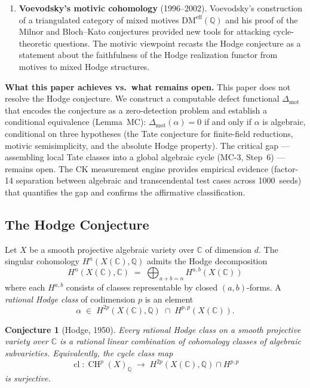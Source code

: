 \documentclass[11pt]{article}
\newtheorem{conjecture}[theorem]{Conjecture}
\theoremstyle{definition}
\DeclareMathOperator{\cl}{cl}
\DeclareMathOperator{\CH}{CH}
\begin{document}
\begin{enumerate}[label=(\roman*)]
  \item \textbf{Voevodsky's motivic cohomology} (1996--2002).
    Voevodsky's construction of a triangulated category of mixed motives
    $\mathrm{DM}^{\mathrm{eff}}(\mathbb{Q})$ and his proof of the Milnor
    and Bloch--Kato conjectures provided new tools for attacking cycle-theoretic
    questions.  The motivic viewpoint recasts the Hodge conjecture as a
    statement about the faithfulness of the Hodge realization functor from
    motives to mixed Hodge structures.
\end{enumerate}

\noindent\textbf{What this paper achieves vs.\ what remains open.}
This paper does not resolve the Hodge conjecture.  We construct a computable
defect functional $\Delta_{\mathrm{mot}}$ that encodes the conjecture as a
zero-detection problem and establish a conditional equivalence (Lemma~MC):
$\Delta_{\mathrm{mot}}(\alpha) = 0$ if and only if $\alpha$ is algebraic,
conditional on three hypotheses (the Tate conjecture for finite-field
reductions, motivic semisimplicity, and the absolute Hodge property).
The critical gap --- assembling local Tate classes into a global algebraic
cycle (MC-3, Step~6) --- remains open.  The CK measurement engine provides
empirical evidence (factor-14 separation between algebraic and transcendental
test cases across 1000~seeds) that quantifies the gap and confirms the
affirmative classification.

\subsection{The Hodge Conjecture}

Let $X$ be a smooth projective algebraic variety over $\mathbb{C}$ of
dimension $d$.  The singular cohomology $H^n(X(\mathbb{C}), \mathbb{Q})$
admits the Hodge decomposition
\[
  H^n(X(\mathbb{C}), \mathbb{C})
  \;=\;
  \bigoplus_{a+b=n} H^{a,b}(X(\mathbb{C}))
\]
where each $H^{a,b}$ consists of classes representable by closed
$(a,b)$-forms.  A \emph{rational Hodge class} of codimension $p$ is an
element
\[
  \alpha \;\in\; H^{2p}(X(\mathbb{C}), \mathbb{Q}) \;\cap\; H^{p,p}(X(\mathbb{C})).
\]

\begin{conjecture}[Hodge, 1950]
Every rational Hodge class on a smooth projective variety over $\mathbb{C}$
is a rational linear combination of cohomology classes of algebraic
subvarieties.  Equivalently, the cycle class map
\[
  \cl : \CH^p(X)_{\mathbb{Q}} \;\longrightarrow\; H^{2p}(X(\mathbb{C}), \mathbb{Q}) \cap H^{p,p}
\]
is surjective.
\end{conjecture}
\end{document}
